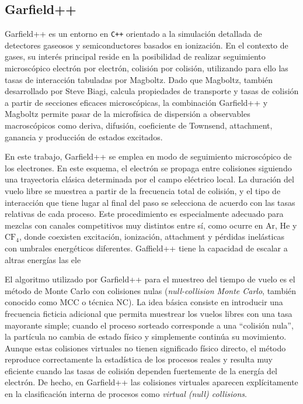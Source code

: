 \documentclass[12pt,a4paper]{article}
\newcommand{\He}{\mathrm{He}}
\newcommand{\Ar}{\mathrm{Ar}}
\newcommand{\CF}{\mathrm{CF}}
\begin{document}
\subsection{Garfield++}

{Garfield++} es un entorno en \texttt{C++} orientado a la simulación detallada de detectores gaseosos y semiconductores basados en ionización. En el contexto de gases, su interés principal reside en la posibilidad de realizar seguimiento microscópico electrón por electrón, colisión por colisión, utilizando para ello las tasas de interacción tabuladas por {Magboltz}. Dado que {Magboltz}, también desarrollado por Steve Biagi, calcula propiedades de transporte y tasas de colisión a partir de secciones eficaces microscópicas, la combinación {Garfield++} y {Magboltz} permite pasar de la microfísica de dispersión a observables macroscópicos como deriva, difusión, coeficiente de Townsend, attachment, ganancia y producción de estados excitados.

En este trabajo, Garfield++ se emplea en modo de seguimiento microscópico de los electrones. En este esquema, el electrón se propaga entre colisiones siguiendo una trayectoria clásica determinada por el campo eléctrico local. La duración del vuelo libre se muestrea a partir de la frecuencia total de colisión, y el tipo de interacción que tiene lugar al final del paso se selecciona de acuerdo con las tasas relativas de cada proceso. Este procedimiento es especialmente adecuado para mezclas con canales competitivos muy distintos entre sí, como ocurre en $\Ar$, $\He$ y $\CF_4$, donde coexisten excitación, ionización, attachment y pérdidas inelásticas con umbrales energéticos diferentes. Gaffield++ tiene la capacidad de escalar a altras energías las ele

El algoritmo utilizado por {Garfield++} para el muestreo del tiempo de vuelo es el método de Monte Carlo con colisiones nulas (\textit{null-collision Monte Carlo}, también conocido como MCC o técnica NC). La idea básica consiste en introducir una frecuencia ficticia adicional que permita muestrear los vuelos libres con una tasa mayorante simple; cuando el proceso sorteado corresponde a una ``colisión nula'', la partícula no cambia de estado físico y simplemente continúa su movimiento. Aunque estas colisiones virtuales no tienen significado físico directo, el método reproduce correctamente la estadística de los procesos reales y resulta muy eficiente cuando las tasas de colisión dependen fuertemente de la energía del electrón. De hecho, en {Garfield++} las colisiones virtuales aparecen explícitamente en la clasificación interna de procesos como \textit{virtual (null) collisions}.
\end{document}
